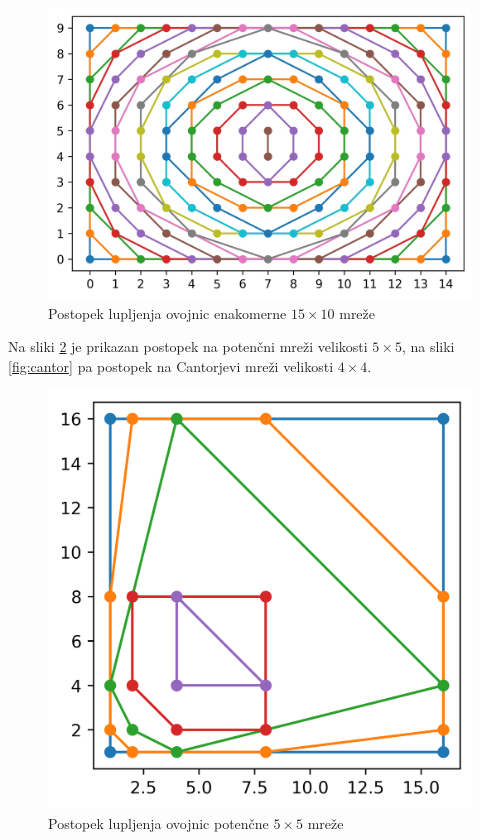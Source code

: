 \documentclass[a4paper]{article}
\begin{document}
\begin{figure}[!h]
	\centering
	\caption{Postopek lupljenja ovojnic enakomerne $15 \times 10$ mreže}
	\label{fig:15x10}
	\includegraphics[scale=0.6]{slike/15x10_enakomerna.jpg}
\end{figure}

\newpage
Na sliki \ref{fig:5x5} je prikazan postopek na potenčni mreži velikosti $5 \times 5$, na sliki \ref{fig:cantor} pa postopek na Cantorjevi mreži velikosti $4 \times 4$.

\begin{figure}[!h]
	\centering
	\caption{Postopek lupljenja ovojnic potenčne $5 \times 5$ mreže}
	\label{fig:5x5}
	\includegraphics[scale=0.8]{slike/5x5_potencna.png}
\end{figure}
\end{document}
